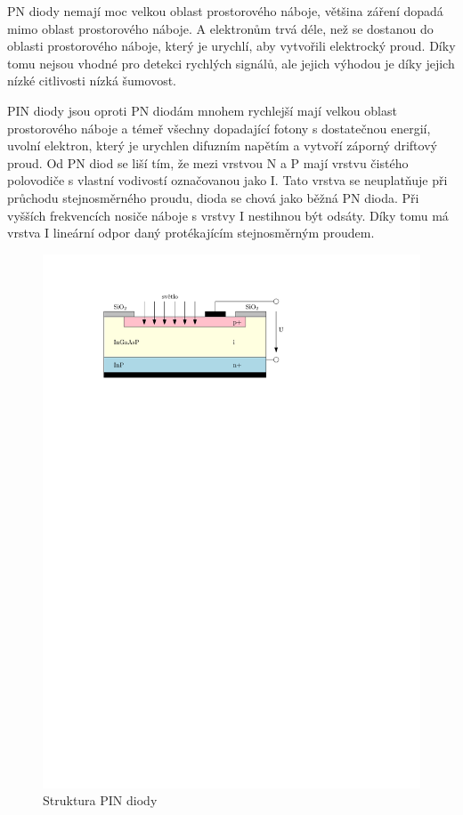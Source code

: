 PN diody nemají moc velkou oblast prostorového náboje, většina záření dopadá mimo oblast prostorového náboje. A elektronům trvá déle, než se dostanou do oblasti prostorového náboje, který je urychlí, aby vytvořili elektrocký proud. Díky tomu nejsou vhodné pro detekci rychlých signálů, ale jejich výhodou je díky jejich nízké citlivosti nízká šumovost.

PIN diody jsou oproti PN diodám mnohem rychlejší mají velkou oblast prostorového náboje a témeř všechny dopadající fotony s dostatečnou energií, uvolní elektron, který je urychlen difuzním napětím a vytvoří záporný driftový proud. Od PN diod se liší tím, že mezi vrstvou N a P mají vrstvu čistého polovodiče s vlastní vodivostí označovanou jako I. Tato vrstva se neuplatňuje při průchodu stejnosměrného proudu, dioda se chová jako běžná PN dioda. Při vyšších frekvencích nosiče náboje s vrstvy I nestihnou být odsáty. Díky tomu má vrstva I lineární odpor daný protékajícím stejnosměrným proudem.

\begin{figure}[H]
    \begin{center}
        \includegraphics[scale=1]{img/pin}
    \end{center}
    \caption{Struktura PIN diody}
\end{figure}

